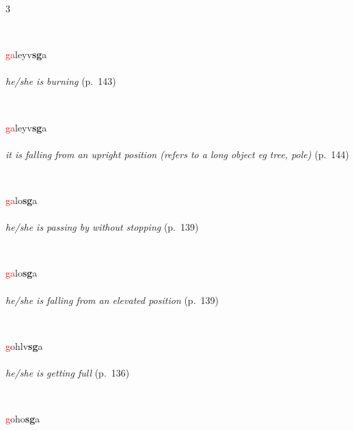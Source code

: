 \documentclass[oneside,openany]{book}%
\begin{document}
\begin{multicols}{3}
\begin{minipage}[t]{\linewidth}
\end{minipage}\\[1em]%
\begin{minipage}[t]{\linewidth}
\raggedright\noindent \textcolor{Red}{ga}leyv\textbf{sg}a\\
\\
\noindent \textit{he/she is burning} (p.~143)
\end{minipage}\\[1em]%
\begin{minipage}[t]{\linewidth}
\raggedright\noindent \textcolor{Red}{ga}leyv\textbf{sg}a\\
\\
\noindent \textit{it is falling from an upright position (refers to a long object eg tree, pole)} (p.~144)
\end{minipage}\\[1em]%
\begin{minipage}[t]{\linewidth}
\raggedright\noindent \textcolor{Red}{ga}lo\textbf{sg}a\\
\\
\noindent \textit{he/she is passing by without stopping} (p.~139)
\end{minipage}\\[1em]%
\begin{minipage}[t]{\linewidth}
\raggedright\noindent \textcolor{Red}{ga}lo\textbf{sg}a\\
\\
\noindent \textit{he/she is falling from an elevated position} (p.~139)
\end{minipage}\\[1em]%
\begin{minipage}[t]{\linewidth}
\raggedright\noindent \textcolor{Red}{g}ohlv\textbf{sg}a\\
\\
\noindent \textit{he/she is getting full} (p.~136)
\end{minipage}\\[1em]%
\begin{minipage}[t]{\linewidth}
\raggedright\noindent \textcolor{Red}{g}oho\textbf{sg}a\\

\end{minipage}
\end{multicols}
\end{document}
